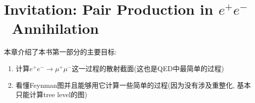 \chapter{Invitation: Pair Production in \texorpdfstring{$e^+e^-$}\ \ Annihilation}

本章介绍了本书第一部分的主要目标:
\begin{enumerate}
  \item 计算$e^+e^-\rightarrow \mu^+\mu^-$这一过程的散射截面(这也是QED中最简单的过程)
  \item 看懂Feynman图并且能够用它计算一些简单的过程(因为没有涉及重整化, 基本只能计算tree level的图)
\end{enumerate}
\pagestyle{fancy}
